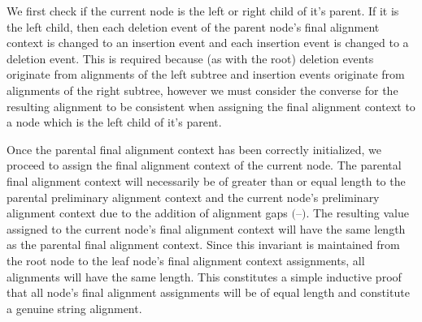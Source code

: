 \documentclass[11pt]{article}
\newcommand*\gap{\textrm{(--)}}
\begin{document}
We first check if the current node is the left or right child of it's parent.
If it is the left child, then each deletion event of the parent node's final alignment context is changed to an insertion event and each insertion event is changed to a deletion event.
This is required because (as with the root) deletion events originate from alignments of the left subtree and insertion events originate from alignments of the right subtree, however we must consider the converse for the resulting alignment to be consistent when assigning the final alignment context to a node which is the left child of it's parent.

Once the parental final alignment context has been correctly initialized, we proceed to assign the final alignment context of the current node.
The parental final alignment context will necessarily be of greater than or equal length to the parental preliminary alignment context and the current node's preliminary alignment context due to the addition of alignment gaps $\gap$.
The resulting value assigned to the current node's final alignment context will have the same length as the parental final alignment context.
Since this invariant is maintained from the root node to the leaf node's final alignment context assignments, all alignments will have the same length.
This constitutes a simple inductive proof that all node's final alignment assignments will be of equal length and constitute a genuine string alignment.
\end{document}
